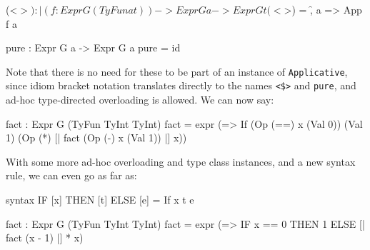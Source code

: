 \begin{code}
(<$>) : |(f : Expr G (TyFun a t)) -> Expr G a -> Expr G t
(<$>) = \f, a => App f a

pure : Expr G a -> Expr G a
pure = id
\end{code} 

\noindent
Note that there is no need for these to be part of an instance of \texttt{Applicative}, since idiom bracket notation translates directly to the names \texttt{<\$>} and \texttt{pure}, and ad-hoc type-directed overloading is allowed.
We can now say:

\begin{code}
fact : Expr G (TyFun TyInt TyInt)
fact = expr (\x => If (Op (==) x (Val 0))
                      (Val 1) (Op (*) [| fact (Op (-) x (Val 1)) |] x))
\end{code} 

\noindent
With some more ad-hoc overloading and type class instances, and a new syntax rule, we can even go as far as:

\begin{code}
syntax IF [x] THEN [t] ELSE [e] = If x t e

fact : Expr G (TyFun TyInt TyInt)
fact = expr (\x => IF x == 0 THEN 1 ELSE [| fact (x - 1) |] * x)
\end{code} 

